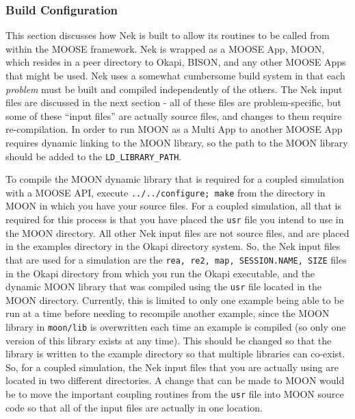 \documentclass[10pt]{article}
\numberwithin{equation}{section} %
\begin{document}
\subsubsection{Build Configuration}
\label{sec:BuildConfig}
This section discusses how Nek is built to allow its routines to be called from within the MOOSE framework. Nek is wrapped as a MOOSE App, MOON, which resides in a peer directory to Okapi, BISON, and any other MOOSE Apps that might be used. Nek uses a somewhat cumbersome build system in that each {\it problem} must be built and compiled independently of the others. The Nek input files are discussed in the next section - all of these files are problem-specific, but some of these ``input files'' are actually source files, and changes to them require re-compilation. In order to run MOON as a Multi App to another MOOSE App requires dynamic linking to the MOON library, so the path to the MOON library should be added to the {\tt LD\_LIBRARY\_PATH}.

To compile the MOON dynamic library that is required for a coupled simulation with a MOOSE API, execute {\tt ../../configure; make} from the directory in MOON in which you have your source files. For a coupled simulation, all that is required for this process is that you have placed the {\tt usr} file you intend to use in the MOON directory. All other Nek input files are not source files, and are placed in the examples directory in the Okapi directory system. So, the Nek input files that are used for a simulation are the {\tt rea, re2, map, SESSION.NAME, SIZE} files in the Okapi directory from which you run the Okapi executable, and the dynamic MOON library that was compiled using the {\tt usr} file located in the MOON directory. \color{magenta} Currently, this is limited to only one example being able to be run at a time before needing to recompile another example, since the MOON library in {\tt moon/lib} is overwritten each time an example is compiled (so only one version of this library exists at any time). This should be changed so that the library is written to the example directory so that multiple libraries can co-exist.\color{black} So, for a coupled simulation, the Nek input files that you are actually using are located in two different directories. \color{magenta} A change that can be made to MOON would be to move the important coupling routines from the {\tt usr} file into MOON source code so that all of the input files are actually in one location. \color{black}
\end{document}
